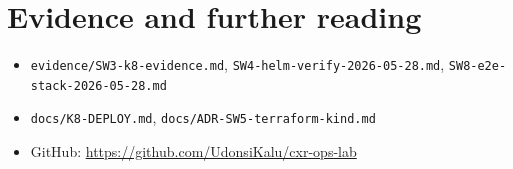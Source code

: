 \documentclass[11pt,a4paper]{report}
\begin{document}
\chapter{Evidence and further reading}

\begin{itemize}
  \item \texttt{evidence/SW3-k8-evidence.md}, \texttt{SW4-helm-verify-2026-05-28.md}, \texttt{SW8-e2e-stack-2026-05-28.md}
  \item \texttt{docs/K8-DEPLOY.md}, \texttt{docs/ADR-SW5-terraform-kind.md}
  \item GitHub: \url{https://github.com/UdonsiKalu/cxr-ops-lab}
\end{itemize}
\end{document}
